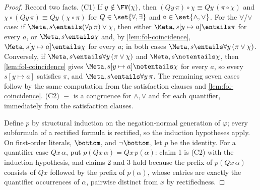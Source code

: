 \begin{proof}
Record two facts.  (C1) If \(y\notin\FV(\chi)\), then
\((Qy\,\pi)\circ\chi\equiv Qy\,(\pi\circ\chi)\) and
\(\chi\circ(Qy\,\pi)\equiv Qy\,(\chi\circ\pi)\) for
\(Q\in\set{\forall,\exists}\) and \(\circ\in\set{\land,\lor}\).  For the
\(\forall\)/\(\lor\) case: if
\(\Meta,s\entails(\forall y\,\pi)\lor\chi\), then either
\(\Meta,s[y\mapsto a]\entails\pi\) for every \(a\), or
\(\Meta,s\entails\chi\) and, by \cref{lem:fol-coincidence},
\(\Meta,s[y\mapsto a]\entails\chi\) for every \(a\); in both cases
\(\Meta,s\entails\forall y\,(\pi\lor\chi)\).  Conversely, if
\(\Meta,s\entails\forall y\,(\pi\lor\chi)\) and
\(\Meta,s\notentails\chi\), then \cref{lem:fol-coincidence} gives
\(\Meta,s[y\mapsto a]\notentails\chi\) for every \(a\), so every
\(s[y\mapsto a]\) satisfies \(\pi\), and
\(\Meta,s\entails\forall y\,\pi\).  The remaining seven cases follow by
the same computation from the satisfaction clauses and
\cref{lem:fol-coincidence}.  (C2) \(\equiv\) is a congruence for
\(\land,\lor\) and for each quantifier, immediately from the
satisfaction clauses.

Define \(p\) by structural induction on the negation-normal generation
of \(\varphi\); every subformula of a rectified formula is rectified, so
the induction hypotheses apply.  On first-order literals, \(\bottom\),
and \(\neg\bottom\), let \(p\) be the identity.  For a quantifier case
\(Qx\,\alpha\), put \(p(Qx\,\alpha)=Qx\,p(\alpha)\): claim 1 is (C2) with
the induction hypothesis, and claims 2 and 3 hold because the prefix of
\(p(Qx\,\alpha)\) consists of \(Qx\) followed by the prefix of
\(p(\alpha)\), whose entries are exactly the quantifier occurrences of
\(\alpha\), pairwise distinct from \(x\) by rectifiedness.


\end{proof}

